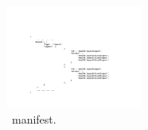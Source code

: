 \begin{figure}[t]
	\centering
			\centering
			\includegraphics[width=0.4\textwidth]{graphs/fig-sift-manifest}
			\caption{\sysname~manifest.}
		\label{fig:sys-overview}
\end{figure}